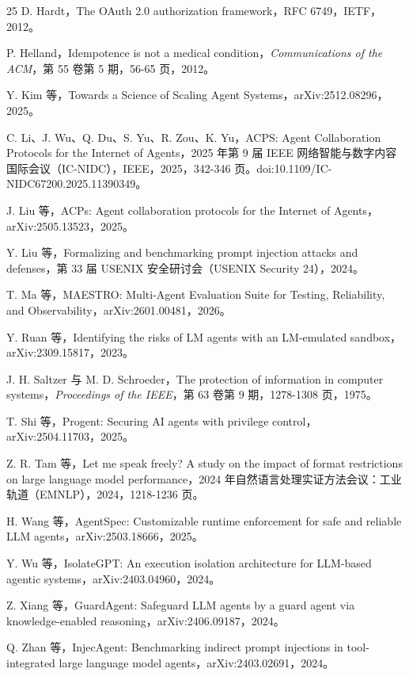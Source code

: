 \documentclass[11pt,a4paper]{article}
\begin{document}
\begin{thebibliography}{25}
 D. Hardt，The OAuth 2.0 authorization framework，RFC 6749，IETF，2012。

 P. Helland，Idempotence is not a medical condition，\emph{Communications of the ACM}，第 55 卷第 5 期，56-65 页，2012。

 Y. Kim 等，Towards a Science of Scaling Agent Systems，arXiv:2512.08296，2025。

 C. Li、J. Wu、Q. Du、S. Yu、R. Zou、K. Yu，ACPS: Agent Collaboration Protocols for the Internet of Agents，2025 年第 9 届 IEEE 网络智能与数字内容国际会议（IC-NIDC），IEEE，2025，342-346 页。doi:10.1109/IC-NIDC67200.2025.11390349。

 J. Liu 等，ACPs: Agent collaboration protocols for the Internet of Agents，arXiv:2505.13523，2025。

 Y. Liu 等，Formalizing and benchmarking prompt injection attacks and defenses，第 33 届 USENIX 安全研讨会（USENIX Security 24），2024。

 T. Ma 等，MAESTRO: Multi-Agent Evaluation Suite for Testing, Reliability, and Observability，arXiv:2601.00481，2026。

 Y. Ruan 等，Identifying the risks of LM agents with an LM-emulated sandbox，arXiv:2309.15817，2023。

 J. H. Saltzer 与 M. D. Schroeder，The protection of information in computer systems，\emph{Proceedings of the IEEE}，第 63 卷第 9 期，1278-1308 页，1975。

 T. Shi 等，Progent: Securing AI agents with privilege control，arXiv:2504.11703，2025。

 Z. R. Tam 等，Let me speak freely? A study on the impact of format restrictions on large language model performance，2024 年自然语言处理实证方法会议：工业轨道（EMNLP），2024，1218-1236 页。

 H. Wang 等，AgentSpec: Customizable runtime enforcement for safe and reliable LLM agents，arXiv:2503.18666，2025。

 Y. Wu 等，IsolateGPT: An execution isolation architecture for LLM-based agentic systems，arXiv:2403.04960，2024。

 Z. Xiang 等，GuardAgent: Safeguard LLM agents by a guard agent via knowledge-enabled reasoning，arXiv:2406.09187，2024。

 Q. Zhan 等，InjecAgent: Benchmarking indirect prompt injections in tool-integrated large language model agents，arXiv:2403.02691，2024。

\end{thebibliography}
\end{document}
